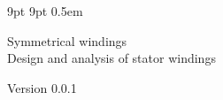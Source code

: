 \documentclass[10pt,a4paper]{book}
\newcommand{\theversion}{0.0.1}
\newcommand{\thedate}{}
\begin{document}
\newcommand{\clearemptydoublepage}{\cleardoublepage}

\newcommand{\blankpage}{\vspace*{1in}\newpage}

\renewcommand{\chaptermark}[1]{\markboth{#1}{}}
\renewcommand{\sectionmark}[1]{\markright{\thesection\ #1}{}}

\lhead[\fancyplain{}{\bfseries\thepage}]%
      {\fancyplain{}{\bfseries\rightmark}}
\rhead[\fancyplain{}{\bfseries\leftmark}]%
      {\fancyplain{}{\bfseries\thepage}}
\cfoot{}

\pagestyle{fancyplain}



\renewcommand\MakeUppercase{}

     {9pt}%
     {9pt}%
     {}%
     {}%
     {\bfseries}%
     {}%
     {0.5em}%
     {}%

\theoremstyle{myex}

\renewcommand{\blankpage}{\thispagestyle{empty} \quad \newpage}

\thispagestyle{empty}

\begin{flushright}
\vspace*{2.0in}

\begin{spacing}{3}
{\huge Symmetrical windings}\\
{\Large Design and analysis of stator windings}
\end{spacing}

\vspace{0.25in}

Version \theversion

\thedate

\vfill

\end{flushright}

\end{document}

